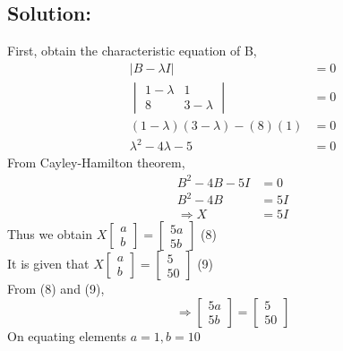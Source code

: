 \documentclass[journal,12pt,twocolumn]{article}
\begin{document}
\subsection*{Solution:}
    First, obtain the characteristic equation of B,
    \begin{align}
        |B-\lambda I| &= 0 
        \\
        \begin{vmatrix} 1-\lambda & 1\\ 8 & 3-\lambda \end{vmatrix} &= 0 
        \\
        (1-\lambda)(3-\lambda)-(8)(1) &= 0
        \\
        \lambda ^2 - 4\lambda -5 &= 0
    \end{align}
        From Cayley-Hamilton theorem,
        \begin{align} 
        B^2 -4B - 5I &= 0
        \\
        B^2 -4B &= 5I
        \\
        \Rightarrow X &= 5I
    \end{align}
    Thus we obtain $X \begin{bmatrix}a\\b\end{bmatrix}
    = \begin{bmatrix}5a\\5b\end{bmatrix} $
    \hfill (8)
    \\
    It is given that $X \begin{bmatrix}a\\b\end{bmatrix}
    = \begin{bmatrix} 5\\50 \end{bmatrix} $
    \hfill (9)
    \\
    From (8) and (9),
    \[ \Rightarrow \begin{bmatrix}5a\\5b\end{bmatrix} 
    =\begin{bmatrix} 5\\50 \end{bmatrix} \]
    On equating elements $a = 1 , b = 10$
\end{document}
